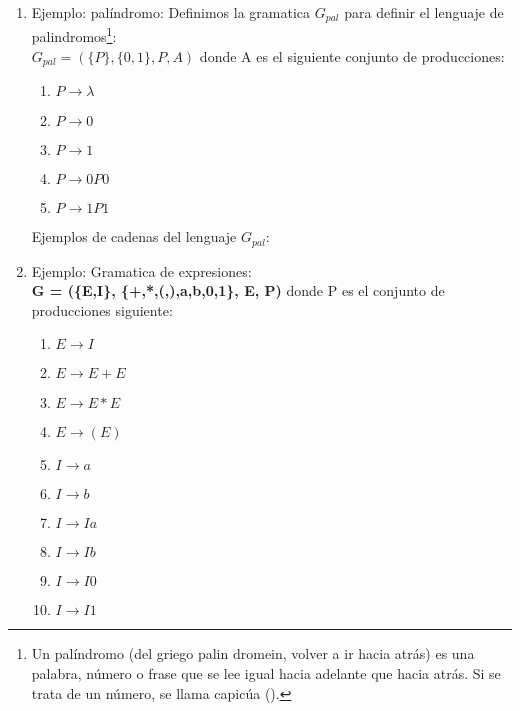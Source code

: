 \begin{enumerate}
\item Ejemplo: palíndromo:
Definimos la gramatica $G_{pal}$ para definir el lenguaje de palindromos\footnote{Un palíndromo (del griego palin dromein, volver a ir hacia atrás) es una palabra, número o frase que se lee igual hacia adelante que hacia atrás. Si se trata de un número, se llama capicúa ().}: \\
$G_{pal} = (\{P\},\{0,1\},P,A)$
donde A es el siguiente conjunto de producciones:
\begin{enumerate}
\item $P \rightarrow \lambda$
\item $P \rightarrow 0$
\item $P \rightarrow 1$
\item $P \rightarrow 0 P 0$
\item $P \rightarrow 1 P 1$
\end{enumerate}
Ejemplos de cadenas del lenguaje $G_{pal}$:

\item Ejemplo: Gramatica de expresiones:\\
\textbf{G = (\{E,I\}, \{+,*,(,),a,b,0,1\}, E, P)} donde P es el conjunto de producciones siguiente:
\begin{enumerate}
\item $E \rightarrow I$
\item $E \rightarrow E + E$
\item $E \rightarrow E * E$
\item $E \rightarrow (E)$
\item $I \rightarrow a$
\item $I \rightarrow b$
\item $I \rightarrow Ia$
\item $I \rightarrow Ib$
\item $I \rightarrow I0$
\item $I \rightarrow I1$
\end{enumerate}
\end{enumerate}

